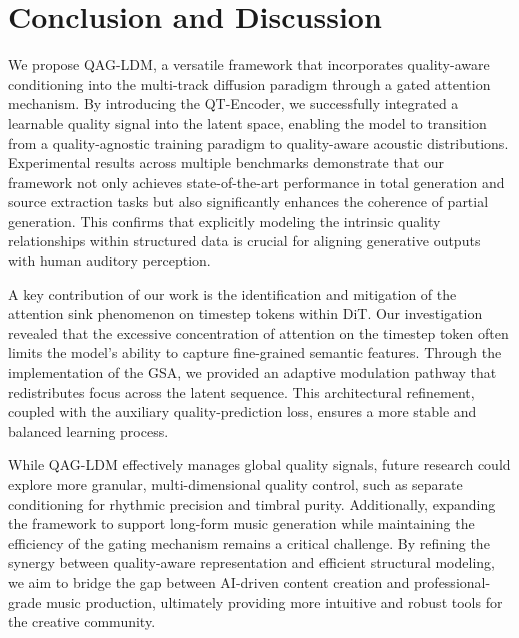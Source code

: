\documentclass[lettersize,journal]{IEEEtran}
\begin{document}
\section{Conclusion and Discussion}
We propose QAG-LDM, a versatile framework that incorporates quality-aware conditioning into the multi-track diffusion paradigm through a gated attention mechanism. By introducing the QT-Encoder, we successfully integrated a learnable quality signal into the latent space, enabling the model to transition from a quality-agnostic training paradigm to quality-aware acoustic distributions. Experimental results across multiple benchmarks demonstrate that our framework not only achieves state-of-the-art performance in total generation and source extraction tasks but also significantly enhances the coherence of partial generation. This confirms that explicitly modeling the intrinsic quality relationships within structured data is crucial for aligning generative outputs with human auditory perception.

A key contribution of our work is the identification and mitigation of the attention sink phenomenon on timestep tokens within DiT. Our investigation revealed that the excessive concentration of attention on the timestep token often limits the model's ability to capture fine-grained semantic features. Through the implementation of the GSA, we provided an adaptive modulation pathway that redistributes focus across the latent sequence. This architectural refinement, coupled with the auxiliary quality-prediction loss, ensures a more stable and balanced learning process. 

While QAG-LDM effectively manages global quality signals, future research could explore more granular, multi-dimensional quality control, such as separate conditioning for rhythmic precision and timbral purity. Additionally, expanding the framework to support long-form music generation while maintaining the efficiency of the gating mechanism remains a critical challenge. By refining the synergy between quality-aware representation and efficient structural modeling, we aim to bridge the gap between AI-driven content creation and professional-grade music production, ultimately providing more intuitive and robust tools for the creative community.


\end{document}
